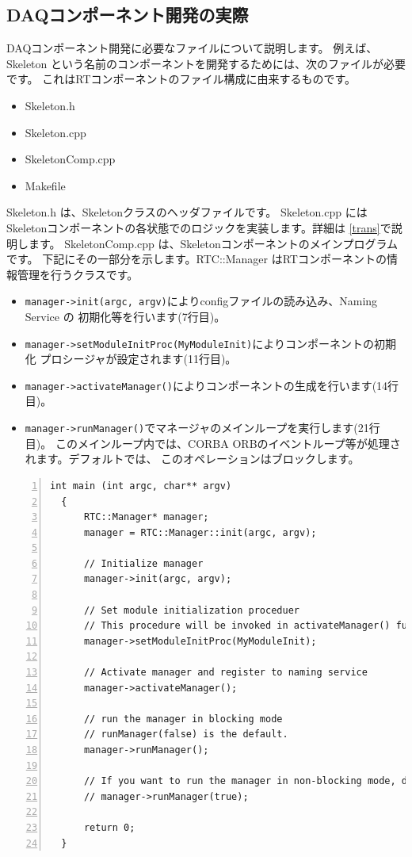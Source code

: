 \documentclass[a4j,10pt,dvips,onecolumn,oneside,final]{jarticle}%
\begin{document}
\subsection{DAQコンポーネント開発の実際}
DAQコンポーネント開発に必要なファイルについて説明します。
例えば、Skeleton という名前のコンポーネントを開発するためには、次のファイルが必要です。
これはRTコンポーネントのファイル構成に由来するものです。
\begin{itemize}
\item Skeleton.h
\item Skeleton.cpp
\item SkeletonComp.cpp
\item Makefile
\end{itemize}

Skeleton.h は、Skeletonクラスのヘッダファイルです。
Skeleton.cpp にはSkeletonコンポーネントの各状態でのロジックを実装します。詳細は
\ref{trans}で説明します。
SkeletonComp.cpp は、Skeletonコンポーネントのメインプログラムです。
下記にその一部分を示します。RTC::Manager はRTコンポーネントの情報管理を行うクラスです。
\begin{itemize}
\item \verb|manager->init(argc, argv)|によりconfigファイルの読み込み、Naming Service の
  初期化等を行います(7行目)。
\item \verb|manager->setModuleInitProc(MyModuleInit)|によりコンポーネントの初期化
プロシージャが設定されます(11行目)。
\item \verb|manager->activateManager()|によりコンポーネントの生成を行います(14行目)。
\item \verb|manager->runManager()|でマネージャのメインループを実行します(21行目)。 
このメインループ内では、CORBA ORBのイベントループ等が処理されます。デフォルトでは、
このオペレーションはブロックします。
\end{itemize}

\begin{Verbatim}[tabsize=4,
    baselinestretch=0.8,
    numbers=left,
    frame=single,
    fontsize=\small,
    framesep=5pt,
    numbersep=5pt]
  int main (int argc, char** argv)
  {
      RTC::Manager* manager;
      manager = RTC::Manager::init(argc, argv);
      
      // Initialize manager
      manager->init(argc, argv);

      // Set module initialization proceduer
      // This procedure will be invoked in activateManager() function.
      manager->setModuleInitProc(MyModuleInit);
    
      // Activate manager and register to naming service
      manager->activateManager();

      // run the manager in blocking mode
      // runManager(false) is the default.
      manager->runManager();

      // If you want to run the manager in non-blocking mode, do like this
      // manager->runManager(true);

      return 0;
  }
\end{Verbatim}
\end{document}

